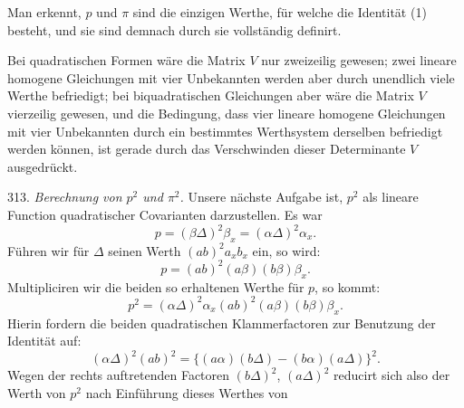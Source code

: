 Man erkennt, $p$ und $\pi$ sind die einzigen Werthe, für welche die
Identität (1) besteht, und sie sind demnach durch sie vollständig
definirt.

Bei quadratischen Formen wäre die Matrix $V$ nur zweizeilig gewesen;
zwei lineare homogene Gleichungen mit vier Unbekannten werden aber
durch unendlich viele Werthe befriedigt; bei biquadratischen
Gleichungen aber wäre die Matrix $V$ vierzeilig gewesen, und die
Bedingung, dass vier lineare homogene Gleichungen mit vier Unbekannten
durch ein bestimmtes Werthsystem derselben befriedigt werden können,
ist gerade durch das Verschwinden dieser Determinante $V$ ausgedrückt.

313. \textit{Berechnung von $p^2$ und $\pi^2$.} Unsere nächste Aufgabe
ist, $p^2$ als lineare Function quadratischer Covarianten
darzustellen. Es war
\[
p = (\beta\Delta)^2\beta_x = (\alpha\Delta)^2\alpha_x.
\]
Führen wir für $\Delta$ seinen Werth $(ab)^2a_xb_x$ ein, so wird:
\[
p = (ab)^2(a\beta)(b\beta)\beta_x.
\]
Multipliciren wir die beiden so erhaltenen Werthe für $p$, so kommt:
\[
p^2 = (\alpha\Delta)^2\alpha_x(ab)^2(a\beta)(b\beta)\beta_x.
\]
Hierin fordern die beiden quadratischen Klammerfactoren zur Benutzung
der Identität auf:
\[
(\alpha\Delta)^2(ab)^2 = \{(a\alpha)(b\Delta) - (b\alpha)(a\Delta)\}^2.
\]
Wegen der rechts auftretenden Factoren $(b\Delta)^2$, $(a\Delta)^2$
reducirt sich also der Werth von $p^2$ nach Einführung dieses Werthes
von


